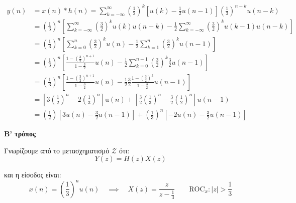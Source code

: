 \documentclass[11pt,a4paper,notitlepage,fleqn]{article}
\begin{document}
\begin{exercise}
\begin{enumpar}
\begin{enumgreekpar}
	\begin{align*}
		y(n) &= x(n) * h(n) = \sum_{k=-\infty}^{\infty}\left(\frac{1}{2}\right)^k\left[
		u(k) - \frac{1}{2}u(n-1)
		\right]\left(\frac{1}{3}\right)^{n-k}u(n-k)
		\\ &= \left(\frac{1}{3}\right)^n\left[
		\sum_{k=-\infty}^{\infty} \left(\frac{3}{2}\right)^k u(k)u(n-k) - \frac{1}{2}\sum_{k=-\infty}^{\infty}\left(\frac{3}{2}\right)^k u(k-1)u(n-k)
		\right]
		\\ &= \left(\frac{1}{3}\right)^n \left[\sum_{k=0}^{n}\left(\frac{3}{2}\right)^k u(n)
		-\frac{1}{2}\sum_{k=1}^{n}\left(\frac{3}{2}\right)^k u(n-1)\right]
		\\ &= \left(\frac{1}{3}\right)^n\left[
		\frac{1-\left(\frac{3}{2}\right)^{n+1}}{1-\frac{3}{2}}u(n)
		-\frac{1}{2}\sum_{k=0}^{n-1}\left(\frac{3}{2}\right)^k \frac{3}{2}u(n-1)
		\right]
		\\ &= \left(\frac{1}{3}\right)^n\left[
		\frac{1-\left(\frac{3}{2}\right)^{n+1}}{1-\frac{3}{2}}u(n)
		-\frac{1}{2}\frac{3}{2}\frac{1-\left(\frac{3}{2}\right)^k}{1-\frac{3}{2}}u(n-1)
		\right]
		\\ &= \left[3\left(\frac{1}{2}\right)^n - 2\left(\frac{1}{3}\right)^n\right]\mathrm{u}(n)
		+\left[\frac{3}{2}\left(\frac{1}{3}\right)^n-\frac{3}{2}\left(\frac{1}{2}\right)^n\right]u(n-1)
		\\ &= \left(\frac{1}{2}\right)\left[3u(n)-\frac{3}{2}u(n-1)\right]
		+ \left(\frac{1}{3}\right)^n \left[ -2u(n)-\frac{3}{2}u(n-1) \right]
	\end{align*}
	\item \textbf{Β' τρόπος}
	
	Γνωρίζουμε από το μετασχηματισμό \( \mathcal{Z} \) ότι:
	\[
	Y(z) = H(z)X(z)
	\]
	
	και η είσοδος είναι:
	\[
	x(n) = \left(\frac{1}{3}\right)^n u(n) \quad \implies \quad X(z) = \frac{z}{z-\frac{1}{3}}
	\qquad \text{ROC}_x:|z|>\frac{1}{3}
	\]
	

\end{enumgreekpar}
\end{enumpar}
\end{exercise}
\end{document}
